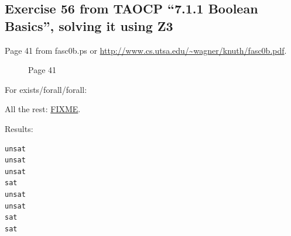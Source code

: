\subsection{Exercise 56 from TAOCP ``7.1.1 Boolean Basics'', solving it using Z3}

Page 41 from fasc0b.ps or \url{http://www.cs.utsa.edu/~wagner/knuth/fasc0b.pdf}.

\begin{figure}[H]
\label{fig:pipe_shuffled}
\centering
{}
\caption{Page 41}
\end{figure}

For exists/forall/forall:



All the rest: \url{FIXME}.

Results:



\begin{lstlisting}
unsat
unsat
unsat
sat
unsat
unsat
sat
sat
\end{lstlisting}

